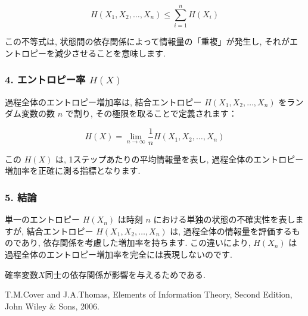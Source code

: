 \documentclass[a4j]{jsarticle}
\begin{document}
{	\[
		H(X_1, X_2, \ldots, X_n) \leq \sum_{i=1}^n H(X_i)
	\]

	この不等式は, 状態間の依存関係によって情報量の「重複」が発生し, それがエントロピーを減少させることを意味します.

	\subsubsection*{4. エントロピー率 $H(X)$}
	過程全体のエントロピー増加率は, 結合エントロピー $H(X_1, X_2, \ldots, X_n)$ をランダム変数の数 $n$ で割り, その極限を取ることで定義されます：

	\[
		H(X) = \lim_{n \to \infty} \frac{1}{n} H(X_1, X_2, \ldots, X_n)
	\]

	この $H(X)$ は, 1ステップあたりの平均情報量を表し, 過程全体のエントロピー増加率を正確に測る指標となります.

	\subsubsection*{5. 結論}
	単一のエントロピー $H(X_n)$ は時刻 $n$ における単独の状態の不確実性を表しますが, 結合エントロピー $H(X_1, X_2, \ldots, X_n)$ は, 過程全体の情報量を評価するものであり, 依存関係を考慮した増加率を持ちます. この違いにより, $H(X_n)$ は過程全体のエントロピー増加率を完全には表現しないのです.

}
確率変数$X$同士の依存関係が影響を与えるためである.


\begin{thebibliography}{99}
	T.M.Cover and J.A.Thomas, Elements of Information Theory, Second Edition, John Wiley \& Sons, 2006.
\end{thebibliography}
\end{document}
